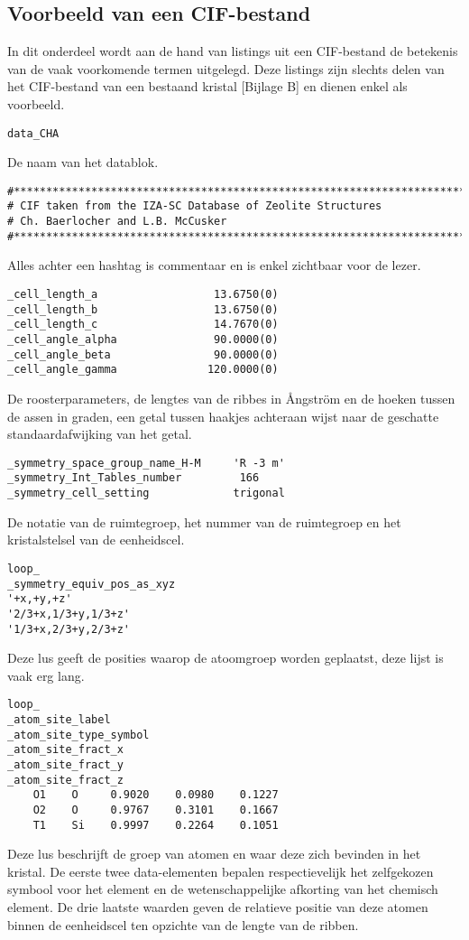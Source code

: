 \subsection{Voorbeeld van een CIF-bestand}

In dit onderdeel wordt aan de hand van listings uit een CIF-bestand de betekenis van de vaak voorkomende termen uitgelegd. Deze listings zijn slechts delen van het CIF-bestand van een bestaand kristal [Bijlage B] en dienen enkel als voorbeeld.


\begin{lstlisting}
data_CHA
\end{lstlisting}
De naam van het datablok.
\begin{lstlisting}
#**************************************************************************
# CIF taken from the IZA-SC Database of Zeolite Structures
# Ch. Baerlocher and L.B. McCusker
#**************************************************************************
\end{lstlisting}
Alles achter een hashtag is commentaar en is enkel zichtbaar voor de lezer. 
\begin{lstlisting}
_cell_length_a                  13.6750(0)
_cell_length_b                  13.6750(0)
_cell_length_c                  14.7670(0)
_cell_angle_alpha               90.0000(0)
_cell_angle_beta                90.0000(0)
_cell_angle_gamma              120.0000(0)
\end{lstlisting}
De roosterparameters, de lengtes van de ribbes in Ångström en de hoeken tussen de assen in graden, een getal tussen haakjes achteraan wijst naar de geschatte standaardafwijking van het getal. 
\begin{lstlisting}
_symmetry_space_group_name_H-M     'R -3 m'
_symmetry_Int_Tables_number         166
_symmetry_cell_setting             trigonal
\end{lstlisting}
De notatie van de ruimtegroep, het nummer van de ruimtegroep en het kristalstelsel van de eenheidscel.
\begin{lstlisting}
loop_
_symmetry_equiv_pos_as_xyz
'+x,+y,+z'
'2/3+x,1/3+y,1/3+z'
'1/3+x,2/3+y,2/3+z'
\end{lstlisting}
Deze lus geeft de posities waarop de atoomgroep worden geplaatst, deze lijst is vaak erg lang.
\begin{lstlisting}
loop_
_atom_site_label
_atom_site_type_symbol
_atom_site_fract_x
_atom_site_fract_y
_atom_site_fract_z
    O1    O     0.9020    0.0980    0.1227
    O2    O     0.9767    0.3101    0.1667
    T1    Si    0.9997    0.2264    0.1051
\end{lstlisting}
Deze lus beschrijft de groep van atomen en waar deze zich bevinden in het kristal. De eerste twee data-elementen bepalen respectievelijk het zelfgekozen symbool voor het element en de wetenschappelijke afkorting van het chemisch element. De drie laatste waarden geven de relatieve positie van deze atomen binnen de eenheidscel ten opzichte van de lengte van de ribben.

